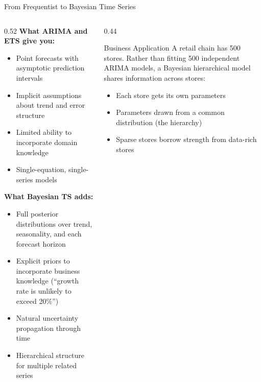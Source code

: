 \documentclass[aspectratio=169, 11pt]{beamer}
\begin{document}
\begin{frame}{From Frequentist to Bayesian Time Series}
  \begin{columns}[T]
    \begin{column}{0.52\textwidth}
      \textbf{What ARIMA and ETS give you:}
      \begin{itemize}\footnotesize
        \item Point forecasts with asymptotic prediction intervals
        \item Implicit assumptions about trend and error structure
        \item Limited ability to incorporate domain knowledge
        \item Single-equation, single-series models
      \end{itemize}
      \vspace{0.1cm}
      \textbf{What Bayesian TS adds:}
      \begin{itemize}\footnotesize
        \item Full posterior distributions over trend, seasonality,
              and each forecast horizon
        \item Explicit priors to incorporate business knowledge
              (``growth rate is unlikely to exceed 20\%'')
        \item Natural uncertainty propagation through time
        \item Hierarchical structure for multiple related series
      \end{itemize}
    \end{column}
    \begin{column}{0.44\textwidth}
      \begin{examplebox}{Business Application}
        \footnotesize A retail chain has 500 stores. Rather than fitting
        500 independent ARIMA models, a Bayesian hierarchical
        model shares information across stores:
        \begin{itemize}\footnotesize
          \item Each store gets its own parameters
          \item Parameters drawn from a common
                distribution (the hierarchy)
          \item Sparse stores borrow strength
                from data-rich stores
        \end{itemize}
      \end{examplebox}
    \end{column}
  \end{columns}
\end{frame}
\end{document}

